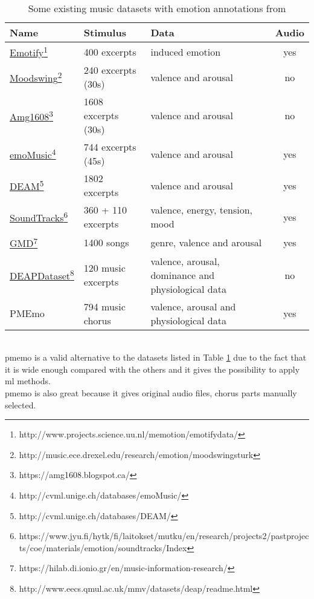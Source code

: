\begin{savenotes}
\begin{table}[h!]
	\centering
	\begin{tabular}{|l|l|p{}|c|}
		\hline
		Name & Stimulus & Data & Audio\\ [0.5ex] 
		\hline\hline \href{http://www.projects.science.uu.nl/memotion/emotifydata/}{Emotify}\footnote{http://www.projects.science.uu.nl/memotion/emotifydata/}  & 400 excerpts & induced emotion & yes	\\ 
		\hline \href{http://music.ece.drexel.edu/research/emotion/moodswingsturk}{Moodswing}\footnote{http://music.ece.drexel.edu/research/emotion/moodswingsturk} & 240 excerpts (30s) & valence and arousal & no \\
		\hline \href{https://amg1608.blogspot.ca/}{Amg1608}\footnote{https://amg1608.blogspot.ca/} & 1608 excerpts (30s) & valence and arousal & no \\
		\hline \href{http://cvml.unige.ch/databases/emoMusic/}{emoMusic}\footnote{http://cvml.unige.ch/databases/emoMusic/} & 744 excerpts (45s) & valence and arousal & yes \\
		\hline \href{http://cvml.unige.ch/databases/DEAM/}{DEAM}\footnote{http://cvml.unige.ch/databases/DEAM/} & 1802 excerpts & valence and arousal & yes \\
		\hline \href{https://www.jyu.fi/hytk/fi/laitokset/mutku/en/research/projects2/pastprojects/coe/materials/emotion/soundtracks/Index}{SoundTracks}\footnote{https://www.jyu.fi/hytk/fi/laitokset/mutku/en/research/projects2/\newline pastprojects/coe/materials/emotion/soundtracks/Index} & 360 + 110 excerpts & valence, energy, tension, mood & yes \\
		\hline \href{https://hilab.di.ionio.gr/en/music-information-research/}{GMD}\footnote{https://hilab.di.ionio.gr/en/music-information-research/} & 1400 songs & genre, valence and arousal & yes \\
		\hline \href{http://www.eecs.qmul.ac.uk/mmv/datasets/deap/readme.html}{DEAPDataset}\footnote{http://www.eecs.qmul.ac.uk/mmv/datasets/deap/readme.html} & 120 music excerpts & valence, arousal, dominance and physiological data & no \\
		\hline PMEmo & 794 music chorus & valence, arousal and physiological data & yes \\
		\hline
	\end{tabular}
	\caption{Some existing music datasets with emotion annotations from \cite{zhang2018pmemo}}
	\label{table:datasets}
\end{table}
\end{savenotes}
\\
\gls{pmemo} is a valid alternative to the datasets listed in Table \ref{table:datasets} due to the fact that it is wide enough compared with the others and it gives the possibility to apply \gls{ml} methods.
\\
\gls{pmemo} is also great because it gives original audio files, chorus parts manually selected.

